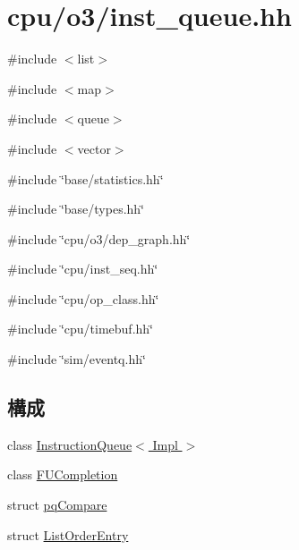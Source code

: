 \hypertarget{o3_2inst__queue_8hh}{
\section{cpu/o3/inst\_\-queue.hh}
\label{o3_2inst__queue_8hh}
}
{\ttfamily \#include $<$list$>$}\par
{\ttfamily \#include $<$map$>$}\par
{\ttfamily \#include $<$queue$>$}\par
{\ttfamily \#include $<$vector$>$}\par
{\ttfamily \#include \char`\"{}base/statistics.hh\char`\"{}}\par
{\ttfamily \#include \char`\"{}base/types.hh\char`\"{}}\par
{\ttfamily \#include \char`\"{}cpu/o3/dep\_\-graph.hh\char`\"{}}\par
{\ttfamily \#include \char`\"{}cpu/inst\_\-seq.hh\char`\"{}}\par
{\ttfamily \#include \char`\"{}cpu/op\_\-class.hh\char`\"{}}\par
{\ttfamily \#include \char`\"{}cpu/timebuf.hh\char`\"{}}\par
{\ttfamily \#include \char`\"{}sim/eventq.hh\char`\"{}}\par
\subsection*{構成}
\begin{DoxyCompactItemize}
\item 
class \hyperlink{classInstructionQueue}{InstructionQueue$<$ Impl $>$}
\item 
class \hyperlink{classInstructionQueue_1_1FUCompletion}{FUCompletion}
\item 
struct \hyperlink{structInstructionQueue_1_1pqCompare}{pqCompare}
\item 
struct \hyperlink{structInstructionQueue_1_1ListOrderEntry}{ListOrderEntry}
\end{DoxyCompactItemize}
